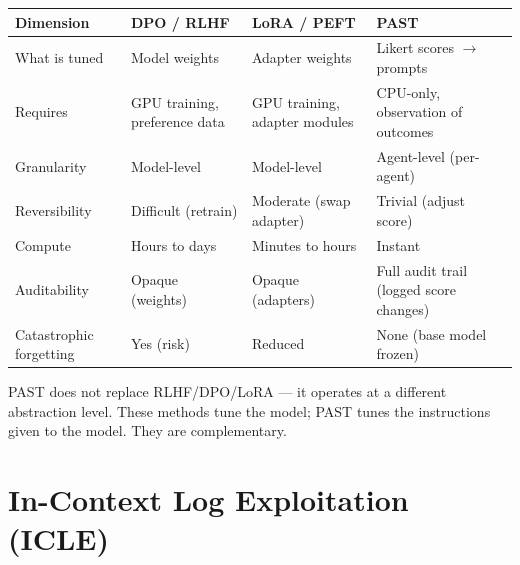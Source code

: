 \documentclass[11pt]{article}
\begin{document}
{\def\LTcaptype{none} %
{\small
\begin{longtable}{@{}
  >{\raggedright\arraybackslash}p{}
  >{\raggedright\arraybackslash}p{}
  >{\raggedright\arraybackslash}p{}
  >{\raggedright\arraybackslash}p{}@{}}
\toprule\noalign{}
\begin{minipage}[b]{\linewidth}\raggedright
Dimension
\end{minipage} & \begin{minipage}[b]{\linewidth}\raggedright
DPO / RLHF
\end{minipage} & \begin{minipage}[b]{\linewidth}\raggedright
LoRA / PEFT
\end{minipage} & \begin{minipage}[b]{\linewidth}\raggedright
PAST
\end{minipage} \\
\midrule\noalign{}
\endhead
\bottomrule\noalign{}
\endlastfoot
\renewcommand{\arraystretch}{1.15}
What is tuned & Model weights & Adapter weights & Likert scores $\rightarrow$ prompts \\
Requires & GPU training, preference data & GPU training, adapter modules & CPU-only, observation of outcomes \\
Granularity & Model-level & Model-level & Agent-level (per-agent) \\
Reversibility & Difficult (retrain) & Moderate (swap adapter) & Trivial (adjust score) \\
Compute & Hours to days & Minutes to hours & Instant \\
Auditability & Opaque (weights) & Opaque (adapters) & Full audit trail (logged score changes) \\
Catastrophic forgetting & Yes (risk) & Reduced & None (base model frozen) \\
\end{longtable}}
}

PAST does not replace RLHF/DPO/LoRA --- it operates at a different abstraction level. These methods tune the model; PAST tunes the instructions given to the model. They are complementary.

\section{In-Context Log Exploitation (ICLE)}\label{in-context-log-exploitation-icle}
\end{document}
